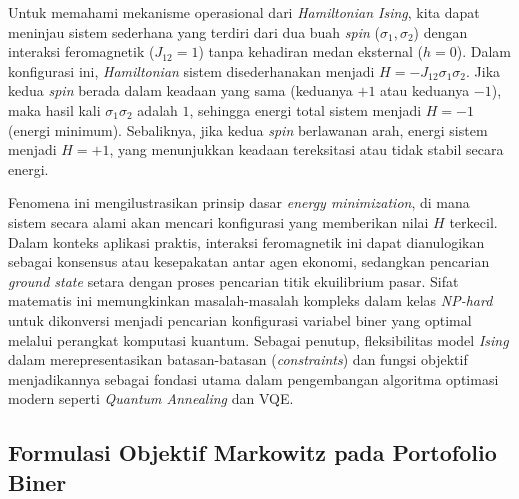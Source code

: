 \begin{example}
    Untuk memahami mekanisme operasional dari \textit{Hamiltonian Ising}, kita dapat meninjau sistem sederhana yang terdiri dari dua buah \textit{spin} ($\sigma_1, \sigma_2$) dengan interaksi feromagnetik ($J_{12} = 1$) tanpa kehadiran medan eksternal ($h = 0$). Dalam konfigurasi ini, \textit{Hamiltonian} sistem disederhanakan menjadi $H = -J_{12} \sigma_1 \sigma_2$. Jika kedua \textit{spin} berada dalam keadaan yang sama (keduanya $+1$ atau keduanya $-1$), maka hasil kali $\sigma_1 \sigma_2$ adalah $1$, sehingga energi total sistem menjadi $H = -1$ (energi minimum). Sebaliknya, jika kedua \textit{spin} berlawanan arah, energi sistem menjadi $H = +1$, yang menunjukkan keadaan tereksitasi atau tidak stabil secara energi.

    Fenomena ini mengilustrasikan prinsip dasar \textit{energy minimization}, di mana sistem secara alami akan mencari konfigurasi yang memberikan nilai $H$ terkecil. Dalam konteks aplikasi praktis, interaksi feromagnetik ini dapat dianulogikan sebagai konsensus atau kesepakatan antar agen ekonomi, sedangkan pencarian \textit{ground state} setara dengan proses pencarian titik ekuilibrium pasar. Sifat matematis ini memungkinkan masalah-masalah kompleks dalam kelas \textit{NP-hard} untuk dikonversi menjadi pencarian konfigurasi variabel biner yang optimal melalui perangkat komputasi kuantum. Sebagai penutup, fleksibilitas model \textit{Ising} dalam merepresentasikan batasan-batasan (\textit{constraints}) dan fungsi objektif menjadikannya sebagai fondasi utama dalam pengembangan algoritma optimasi modern seperti \textit{Quantum Annealing} dan VQE.
\end{example}

\subsection{Formulasi Objektif Markowitz pada Portofolio Biner}

